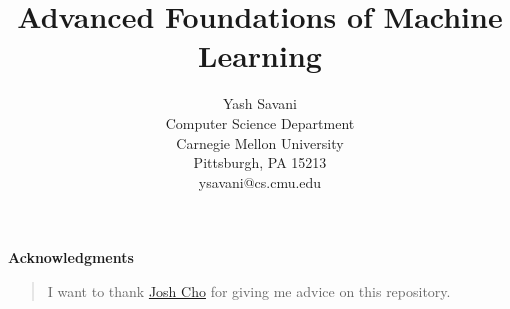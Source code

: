 \documentclass[12pt,oneside]{book}
\title{\bf{Advanced Foundations of Machine Learning}}
\author{
	Yash Savani \\
	Computer Science Department \\
	Carnegie Mellon University \\
	Pittsburgh, PA 15213 \\
	ysavani@cs.cmu.edu
}
\newenvironment{psuedochapter}[1]
{\cleardoublepage
  \thispagestyle{empty}
  \begin{center} \large {\bf #1} \end{center}
  \begin{quotation}}
  {\end{quotation}
  \vspace*{\stretch{3}}
  \clearpage
}
\begin{document}
\frontmatter

\pagestyle{fancy}

\maketitle

\begin{psuedochapter}{Acknowledgments}
I want to thank \href{https://github.com/joshcho}{Josh Cho} for giving me advice on this repository.
\end{psuedochapter}

\tableofcontents

\mainmatter






















\end{document}
